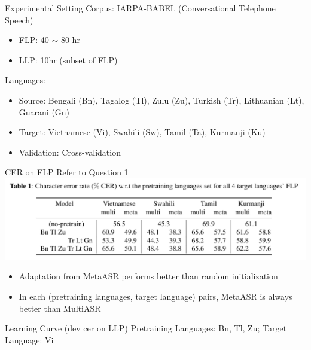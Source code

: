 \documentclass{beamer}
\begin{document}
\begin{frame}[t]{Experimental Setting}
  Corpus: IARPA-BABEL (Conversational Telephone Speech)
  \begin{itemize}
    \item FLP: 40 $\sim$ 80 hr
    \item LLP: 10hr (subset of FLP)
  \end{itemize}
  \pause
  Languages:
  \begin{itemize}
    \item Source: Bengali (Bn), Tagalog (Tl), Zulu (Zu), Turkish (Tr), Lithuanian (Lt), Guarani (Gn)
    \item Target: Vietnamese (Vi), Swahili (Sw), Tamil (Ta), Kurmanji (Ku)
    \item Validation: Cross-validation
  \end{itemize}
\end{frame}

\begin{frame}[t]{CER on FLP}
  Refer to Question 1
  \center \includegraphics[width=1.0\textwidth]{fig/flp_table.png}

  \begin{itemize}
    \item Adaptation from MetaASR performs better than random initialization
    \item In each (pretraining languages, target language) pairs, MetaASR is always better than MultiASR
  \end{itemize}
\end{frame}

\begin{frame}[t]{Learning Curve (dev cer on LLP)}
  Pretraining Languages: Bn, Tl, Zu; Target Language: Vi

    \begin{figure}[H]
    \centering
  \end{figure}
\end{frame}
\end{document}
